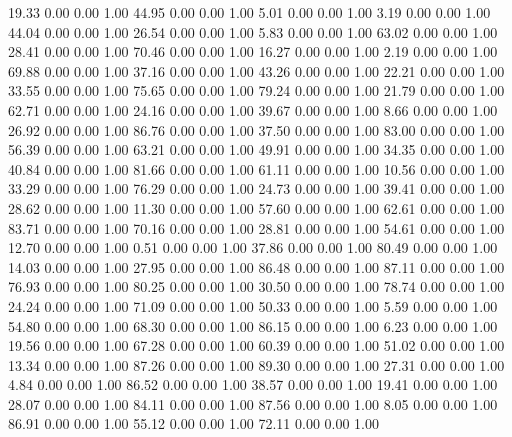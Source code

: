    19.33   0.00   0.00   1.00
   44.95   0.00   0.00   1.00
    5.01   0.00   0.00   1.00
    3.19   0.00   0.00   1.00
   44.04   0.00   0.00   1.00
   26.54   0.00   0.00   1.00
    5.83   0.00   0.00   1.00
   63.02   0.00   0.00   1.00
   28.41   0.00   0.00   1.00
   70.46   0.00   0.00   1.00
   16.27   0.00   0.00   1.00
    2.19   0.00   0.00   1.00
   69.88   0.00   0.00   1.00
   37.16   0.00   0.00   1.00
   43.26   0.00   0.00   1.00
   22.21   0.00   0.00   1.00
   33.55   0.00   0.00   1.00
   75.65   0.00   0.00   1.00
   79.24   0.00   0.00   1.00
   21.79   0.00   0.00   1.00
   62.71   0.00   0.00   1.00
   24.16   0.00   0.00   1.00
   39.67   0.00   0.00   1.00
    8.66   0.00   0.00   1.00
   26.92   0.00   0.00   1.00
   86.76   0.00   0.00   1.00
   37.50   0.00   0.00   1.00
   83.00   0.00   0.00   1.00
   56.39   0.00   0.00   1.00
   63.21   0.00   0.00   1.00
   49.91   0.00   0.00   1.00
   34.35   0.00   0.00   1.00
   40.84   0.00   0.00   1.00
   81.66   0.00   0.00   1.00
   61.11   0.00   0.00   1.00
   10.56   0.00   0.00   1.00
   33.29   0.00   0.00   1.00
   76.29   0.00   0.00   1.00
   24.73   0.00   0.00   1.00
   39.41   0.00   0.00   1.00
   28.62   0.00   0.00   1.00
   11.30   0.00   0.00   1.00
   57.60   0.00   0.00   1.00
   62.61   0.00   0.00   1.00
   83.71   0.00   0.00   1.00
   70.16   0.00   0.00   1.00
   28.81   0.00   0.00   1.00
   54.61   0.00   0.00   1.00
   12.70   0.00   0.00   1.00
    0.51   0.00   0.00   1.00
   37.86   0.00   0.00   1.00
   80.49   0.00   0.00   1.00
   14.03   0.00   0.00   1.00
   27.95   0.00   0.00   1.00
   86.48   0.00   0.00   1.00
   87.11   0.00   0.00   1.00
   76.93   0.00   0.00   1.00
   80.25   0.00   0.00   1.00
   30.50   0.00   0.00   1.00
   78.74   0.00   0.00   1.00
   24.24   0.00   0.00   1.00
   71.09   0.00   0.00   1.00
   50.33   0.00   0.00   1.00
    5.59   0.00   0.00   1.00
   54.80   0.00   0.00   1.00
   68.30   0.00   0.00   1.00
   86.15   0.00   0.00   1.00
    6.23   0.00   0.00   1.00
   19.56   0.00   0.00   1.00
   67.28   0.00   0.00   1.00
   60.39   0.00   0.00   1.00
   51.02   0.00   0.00   1.00
   13.34   0.00   0.00   1.00
   87.26   0.00   0.00   1.00
   89.30   0.00   0.00   1.00
   27.31   0.00   0.00   1.00
    4.84   0.00   0.00   1.00
   86.52   0.00   0.00   1.00
   38.57   0.00   0.00   1.00
   19.41   0.00   0.00   1.00
   28.07   0.00   0.00   1.00
   84.11   0.00   0.00   1.00
   87.56   0.00   0.00   1.00
    8.05   0.00   0.00   1.00
   86.91   0.00   0.00   1.00
   55.12   0.00   0.00   1.00
   72.11   0.00   0.00   1.00
